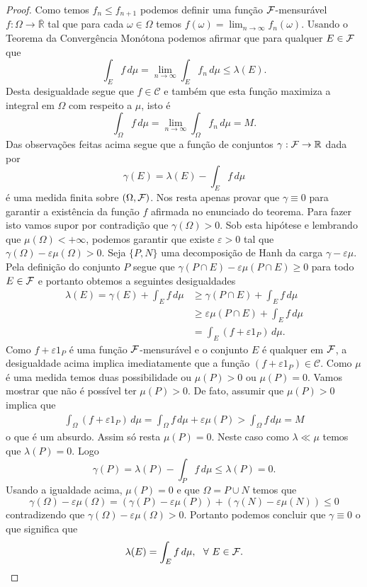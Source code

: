 \begin{proof}
Como temos $f_n\leq f_{n+1}$ podemos definir uma função
$\mathcal{F}$-mensurável  $f:\Omega\to\overline{\mathbb{R}}$ tal que
para cada $\omega\in\Omega$ temos
$f(\omega) =\lim_{n\to\infty} f_n(\omega)$.
Usando o Teorema da Convergência Monótona podemos afirmar que 
para qualquer $E\in\mathcal{F}$ que 
\[
\int_{E} f\, d\mu
=
\lim_{n\to\infty}
\int_{E} f_n\, d\mu
\leq
\lambda(E).
\]
Desta desigualdade segue que $f\in\mathscr{C}$ e 
também que esta função maximiza a integral em $\Omega$
com respeito a $\mu$, isto é 
\[
\int_{\Omega} f\, d\mu 
=
\lim_{n\to\infty}
\int_{\Omega} f_n\, d\mu
=
M.
\]
Das observações feitas acima segue que a função de
conjuntos $\gamma:\mathcal{F}\to\mathbb{R}$ dada por 
\[
\gamma(E) 
=
\lambda(E) - \int_{E} f\, d\mu 
\]
é uma medida finita sobre $(\Omega,\mathcal{F})$.
Nos resta apenas provar que $\gamma \equiv 0$
para garantir a existência da função $f$ afirmada
no enunciado do teorema.
Para fazer isto vamos supor 
por contradição que $\gamma(\Omega)>0$.
Sob esta hipótese e lembrando que $\mu(\Omega)<+\infty$, 
podemos garantir que existe $\varepsilon>0$ 
tal que $\gamma(\Omega)-\varepsilon \mu(\Omega)>0$.
Seja $\{P,N\}$ uma decomposição de Hanh da carga 
$\gamma-\varepsilon\mu$. Pela definição do conjunto 
$P$ segue que $\gamma(P\cap E)-\varepsilon\mu(P\cap E)\geq 0$
para todo $E\in \mathcal{F}$ e portanto obtemos a seguintes 
desigualdades
\begin{align*}
\lambda(E) 
= 
\gamma(E)+\int_{E} f\, d\mu
&\geq 
\gamma(P\cap E)+\int_{E} f\, d\mu
\\
&\geq
\varepsilon \mu(P\cap E)+\int_{E} f\, d\mu
\\
&=
\int_{E} (f+\varepsilon 1_{P})\, d\mu.
\end{align*}
Como $f+\varepsilon 1_{P}$ é uma função $\mathcal{F}$-mensurável
e o conjunto $E$ é qualquer em $\mathcal{F}$, 
a desigualdade acima implica imediatamente que
a função $(f+\varepsilon 1_{P})\in \mathscr{C}$.
Como $\mu$ é uma medida temos duas possibilidade
ou $\mu(P)>0$ ou $\mu(P)=0$. Vamos mostrar que 
não é possível ter $\mu(P)>0$. 
De fato, assumir que $\mu(P)>0$ implica que 
%
\begin{align*}
\int_{\Omega}  
(f+\varepsilon 1_{P})\, d\mu
=
\int_{\Omega} f\, d\mu
+
\varepsilon\mu(P)
>
\int_{\Omega} f\, d\mu
=
M
\end{align*}
o que é um absurdo. Assim só resta $\mu(P)=0$.
Neste caso como $\lambda\ll \mu$ temos que 
$\lambda(P)=0$. Logo 
\[
\gamma(P) 
= 
\lambda(P)-\int_{P} f\, d\mu
\leq 
\lambda(P)
=
0.
\]
Usando a igualdade acima, $\mu(P)=0$ e que $\Omega = P\cup N$ 
temos que 
\[
\gamma(\Omega)-\varepsilon\mu(\Omega)
=
(\gamma(P)-\varepsilon\mu(P))
+
(\gamma(N)-\varepsilon\mu(N))
\leq 
0
\]
contradizendo que $\gamma(\Omega)-\varepsilon\mu(\Omega)>0$.
Portanto podemos concluir que $\gamma\equiv 0$ o 
que significa que 
\[
\lambda(E)
=
\int_E f\, d\mu,
\ \ \forall\ E\in\mathcal{F}.
\]
\end{proof}
